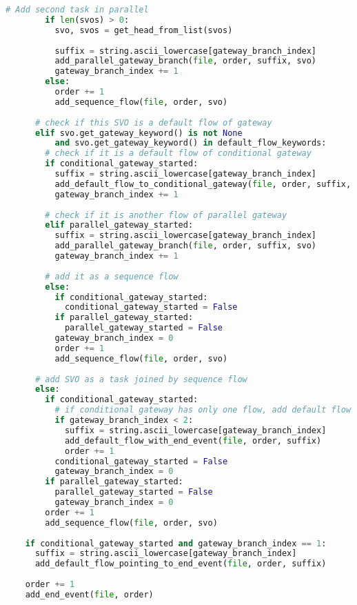 \begin{lstlisting}[language=Python, caption={Intermediate process model generation function listing}, label={lst:intermediate_model_generation}]
        # Add second task in parallel
        if len(svos) > 0:
          svo, svos = get_head_from_list(svos)
        
          suffix = string.ascii_lowercase[gateway_branch_index]
          add_parallel_gateway_branch(file, order, suffix, svo)
          gateway_branch_index += 1
        else:
          order += 1
          add_sequence_flow(file, order, svo)
      
      # check if this SVO is a default flow of gateway
      elif svo.get_gateway_keyword() is not None
          and svo.get_gateway_keyword() in default_flow_keywords:
        # check if it is a default flow of conditional gateway
        if conditional_gateway_started:
          suffix = string.ascii_lowercase[gateway_branch_index]
          add_default_flow_to_conditional_gateway(file, order, suffix, svo)
          gateway_branch_index += 1
        
        # check if it is another flow of parallel gateway
        elif parallel_gateway_started:
          suffix = string.ascii_lowercase[gateway_branch_index]
          add_parallel_gateway_branch(file, order, suffix, svo)
          gateway_branch_index += 1
      
        # add it as a sequence flow
        else:
          if conditional_gateway_started:
            conditional_gateway_started = False
          if parallel_gateway_started:
            parallel_gateway_started = False
          gateway_branch_index = 0
          order += 1
          add_sequence_flow(file, order, svo)
        
      # add SVO as a task joined by sequence flow 
      else:
        if conditional_gateway_started:
          # if conditional gateway has only one flow, add default flow which leads to end event
          if gateway_branch_index < 2:
            suffix = string.ascii_lowercase[gateway_branch_index]
            add_default_flow_with_end_event(file, order, suffix)
            order += 1
          conditional_gateway_started = False
          gateway_branch_index = 0
        if parallel_gateway_started:
          parallel_gateway_started = False
          gateway_branch_index = 0
        order += 1
        add_sequence_flow(file, order, svo)
      
    if conditional_gateway_started and gateway_branch_index == 1:
      suffix = string.ascii_lowercase[gateway_branch_index]
      add_default_flow_pointing_to_end_event(file, order, suffix)
    
    order += 1
    add_end_event(file, order)
\end{lstlisting}